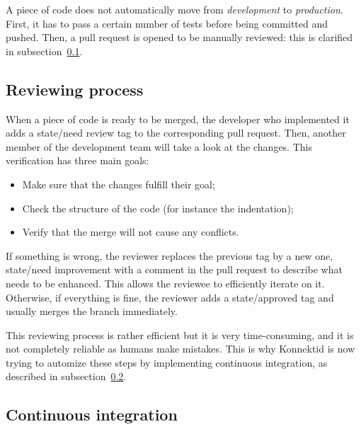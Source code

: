 A piece of code does not automatically move from \textit{development} to \textit{production}. First, it has to pass a certain number of tests before being committed and pushed. Then, a pull request is opened to be manually reviewed: this is clarified in {\sc subsection}~\ref{ssec:reviewing}.

\subsection{Reviewing process}
\label{ssec:reviewing}

When a piece of code is ready to be merged, the developer who implemented it adds a \guillemotleft{} state/need review \guillemotright{} tag to the corresponding pull request. Then, another member of the development team will take a look at the changes. This verification has three main goals:

\begin{itemize}[noitemsep]
	\item Make sure that the changes fulfill their goal;
 	\item Check the structure of the code (for instance the indentation);
	\item Verify that the merge will not cause any conflicts.
\end{itemize}

If something is wrong, the reviewer replaces the previous tag by a new one, \guillemotleft{} state/need improvement \guillemotright{} with a comment in the pull request to describe what needs to be enhanced. This allows the reviewee to efficiently iterate on it. Otherwise, if everything is fine, the reviewer adds a \guillemotleft{} state/approved \guillemotright{} tag and usually merges the branch immediately.

This reviewing process is rather efficient but it is very time-consuming, and it is not completely reliable as humans make mistakes. This is why Konnektid is now trying to automize these steps by implementing continuous integration, as described in {\sc subsection}~\ref{ssec:ci}.

\subsection{Continuous integration}
\label{ssec:ci}
